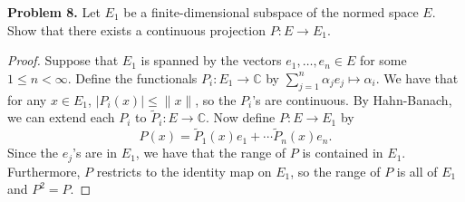 \documentclass[11pt,letterpaper]{report}
\newcommand{\complex}{\mathbb{C}}
\begin{document}
\noindent\textbf{Problem 8. }
Let $E_1$ be a finite-dimensional subspace of the normed space $E$. Show that there exists a continuous projection $P:E\to E_1$.
\begin{proof}
	Suppose that $E_1$ is spanned by the vectors $e_1, \ldots, e_n\in E$ for some $1\leq n<\infty$. Define the functionals $P_i: E_1\to \complex$ by $\sum_{j=1}^n \alpha_j e_j\mapsto \alpha_i$. We have that for any $x\in E_1$, $|P_i(x)|\leq \|x\|$, so the $P_i$'s are continuous. By Hahn-Banach, we can extend each $P_i$ to $\tilde{P}_i: E\to \complex$. Now define $P: E\to E_1$ by
	\[
	P(x) = \tilde{P}_1(x)e_1 + \cdots \tilde{P}_n(x)e_n.
	\]
	Since the $e_j$'s are in $E_1$, we have that the range of $P$ is contained in $E_1$. Furthermore, $P$ restricts to the identity map on $E_1$, so the range of $P$ is all of $E_1$ and $P^2 = P$.
\end{proof}
\end{document}
